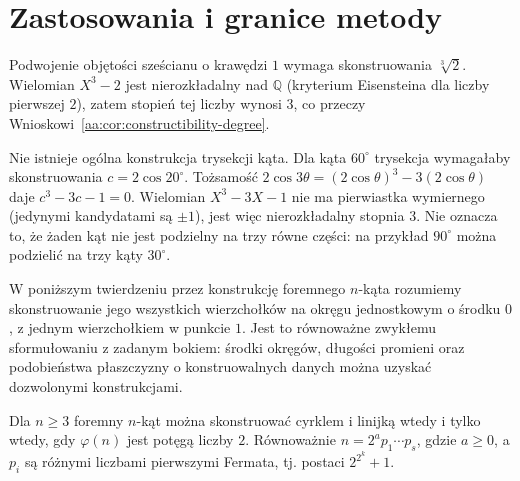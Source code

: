\section{Zastosowania i granice metody}
\begin{przyklad}\label{aa:prz:double-cube}
Podwojenie objętości sześcianu o krawędzi $1$ wymaga skonstruowania $\sqrt[3]{2}$. Wielomian $X^3-2$ jest nierozkładalny nad $\mathbb Q$ (kryterium Eisensteina dla liczby pierwszej $2$), zatem stopień tej liczby wynosi $3$, co przeczy Wnioskowi~\ref{aa:cor:constructibility-degree}.
\end{przyklad}
\begin{przyklad}\label{aa:prz:trisect-angle}
Nie istnieje ogólna konstrukcja trysekcji kąta. Dla kąta $60^\circ$ trysekcja wymagałaby skonstruowania $c=2\cos20^\circ$. Tożsamość $2\cos3\theta=(2\cos\theta)^3-3(2\cos\theta)$ daje $c^3-3c-1=0$. Wielomian $X^3-3X-1$ nie ma pierwiastka wymiernego (jedynymi kandydatami są $\pm1$), jest więc nierozkładalny stopnia $3$. Nie oznacza to, że żaden kąt nie jest podzielny na trzy równe części: na przykład $90^\circ$ można podzielić na trzy kąty $30^\circ$.
\end{przyklad}
W poniższym twierdzeniu przez konstrukcję foremnego $n$-kąta
rozumiemy skonstruowanie jego wszystkich wierzchołków
na okręgu jednostkowym o środku $0$, z jednym wierzchołkiem
w punkcie $1$. Jest to równoważne zwykłemu sformułowaniu
z zadanym bokiem: środki okręgów, długości promieni
oraz podobieństwa płaszczyzny o konstruowalnych danych
można uzyskać dozwolonymi konstrukcjami.
\begin{twierdzenie}\label{aa:tw:regular-polygon}
Dla $n\ge3$ foremny $n$-kąt można skonstruować cyrklem i linijką wtedy i tylko wtedy, gdy $\varphi(n)$ jest potęgą liczby $2$. Równoważnie $n=2^a p_1\cdots p_s$, gdzie $a\ge0$, a $p_i$ są różnymi liczbami pierwszymi Fermata, tj. postaci $2^{2^k}+1$.
\end{twierdzenie}
